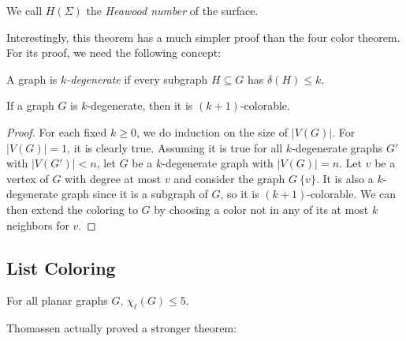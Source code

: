 We call $H(\Sigma)$ the \emph{Heawood number} of the surface.

Interestingly, this theorem has a much simpler proof than the four color theorem. For its proof, we need the following concept:


\begin{definition} A graph is $k$\emph{-degenerate} if every subgraph $H \subseteq G$ has $\delta(H) \leq k$.
\end{definition}

\begin{proposition}
If a graph $G$ is $k$-degenerate, then it is $(k+1)$-colorable.
\end{proposition}

\begin{proof}
For each fixed $k \geq 0$, we do induction on the size of $|V(G)|$. For $|V(G)| = 1$, it is clearly true. Assuming it is true for all $k$-degenerate graphs $G'$ with $|V(G')| < n$, let $G$ be a $k$-degenerate graph with $|V(G)| = n$. Let $v$ be a vertex of $G$ with degree at most $v$ and consider the graph $G \ \{v\}$. It is also a $k$-degenerate graph since it is a subgraph of $G$, so it is $(k+1)$-colorable. We can then extend the coloring to $G$ by choosing a color not in any of its at most $k$ neighbors for $v$.
\end{proof}





\subsection{List Coloring}




\cite{thomassenplanargraphchoosable}

\begin{theorem}
\label{thomassentheorem}
For all planar graphs $G$, $\chi_{\ell}(G) \leq 5$.
\end{theorem}

Thomassen actually proved a stronger theorem: 


